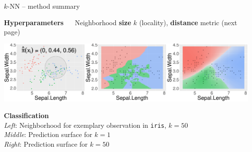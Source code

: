 \documentclass[11pt,compress,t,notes=noshow, xcolor=table]{beamer}
\newcommand{\highlight}[1]{\textcolor{hlcol}{\textbf{#1}}}
\begin{document}
\begin{frame2} {$k$-NN -- method summary}

  \highlight{Hyperparameters} ~~ Neighborhood \textbf{size} $k$ (locality), 
  \textbf{distance} metric (next page)

  \vspace{5px}

  \begin{minipage}{0.7\textwidth}
    \includegraphics[width=\textwidth]{figure/knn-neighborhood.pdf}
  \end{minipage}%
  \hfill
  \begin{minipage}{0.25\textwidth}
    \tiny
    \raggedright
    \textbf{Classification} \\
    \textit{Left}: Neighborhood for exemplary observation in \texttt{iris}, 
    $k = 50$ \\
    \textit{Middle}: Prediction surface for $k = 1$\\
    \textit{Right}: Prediction surface for $k = 50$
  \end{minipage}


\end{frame2}
\end{document}
